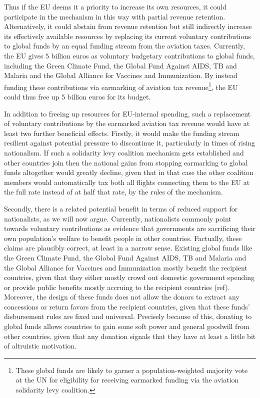 Thus if the EU deems it a priority to increase its own resources, it could participate in the mechanism in this way with partial revenue retention. Alternatively, it could abstain from revenue retention but still indirectly increase its effectively available resources by replacing its current voluntary contributions to global funds by an equal funding stream from the aviation taxes. Currently, the EU gives $5$ billion euros as voluntary budgetary contributions to global funds, including the Green Climate Fund, the Global Fund Against AIDS, TB and Malaria and the Global Alliance for Vaccines and Immunization. By instead funding these contributions via earmarking of aviation tax revenue\footnote{These global funds are likely to garner a population-weighted majority vote at the UN for eligibility for receiving earmarked funding via the aviation solidarity levy coalition. }, the EU could thus free up 5 billion euros for its budget.

In addition to freeing up resources for EU-internal spending, such a replacement of voluntary contributions by the earmarked aviation tax revenue would have at least two further beneficial effects. Firstly, it would make the funding stream resilient against potential pressure to discontinue it, particularly in times of rising nationalism. If such a solidarity levy coalition mechanism gets established and other countries join then the national gains from stopping earmarking to global funds altogether would greatly decline, given that in that case the other coalition members would automatically tax both all flights connecting them to the EU at the full rate instead of at half that rate, by the rules of the mechanism.

Secondly, there is a related potential benefit in terms of reduced support for nationalists, as we will now argue. Currently, nationalists commonly point towards voluntary contributions as evidence that governments are sacrificing their own population's welfare to benefit people in other countries. Factually, these claims are plausibly correct, at least in a narrow sense. Existing global funds like the Green Climate Fund, the Global Fund Against AIDS, TB and Malaria and the Global Alliance for Vaccines and Immunization mostly benefit the recipient countries, given that they either mostly crowd out domestic government spending or provide public benefits mostly accruing to the recipient countries (ref). Moreover, the design of these funds does not allow the donors to extract any concessions or return favors from the recipient countries, given that these funds' disbursement rules are fixed and universal. Precisely because of this, donating to global funds allows countries to gain some soft power and general goodwill from other countries, given that any donation signals that they have at least a little bit of altruistic motivation.

